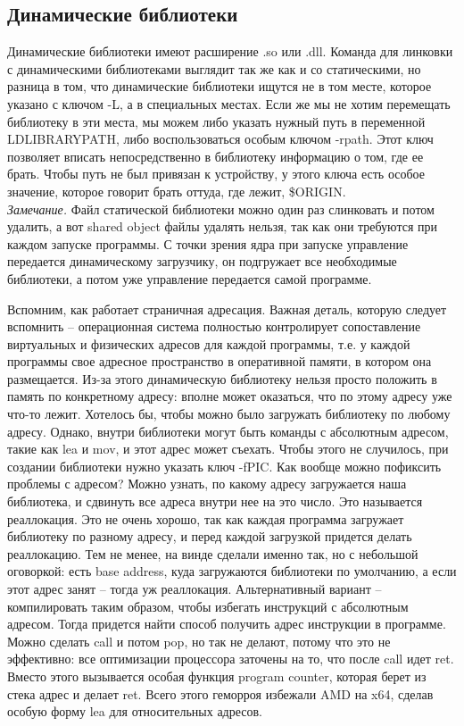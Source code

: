 \documentclass[12pt, a4paper]{article}
\begin{document}
\subsection{Динамические библиотеки}
Динамические библиотеки имеют расширение .so или .dll. Команда для линковки с динамическими библиотеками выглядит так же как и со статическими, но разница в том, что динамические библиотеки ищутся не в том месте, которое указано с ключом -L, а в специальных местах. Если же мы не хотим перемещать библиотеку в эти места, мы можем либо указать нужный путь в переменной LD\textunderscore LIBRARY\textunderscore PATH, либо воспользоваться особым ключом -rpath. Этот ключ позволяет вписать непосредственно в библиотеку информацию о том, где ее брать. Чтобы путь не был привязан к устройству, у этого ключа есть особое значение, которое говорит брать оттуда, где лежит, \$ORIGIN.\\
\textit{Замечание.} Файл статической библиотеки можно один раз слинковать и потом удалить, а вот shared object файлы удалять нельзя, так как они требуются при каждом запуске программы. С точки зрения ядра при запуске управление передается динамическому загрузчику, он подгружает все необходимые библиотеки, а потом уже управление передается самой программе.\\
\par Вспомним, как работает страничная адресация. Важная деталь, которую следует вспомнить -- операционная система полностью контролирует сопоставление виртуальных и физических адресов для каждой программы, т.е. у каждой программы свое адресное пространство в оперативной памяти, в котором она размещается. Из-за этого динамическую библиотеку нельзя просто положить в память по конкретному адресу: вполне может оказаться, что по этому адресу уже что-то лежит. Хотелось бы, чтобы можно было загружать библиотеку по любому адресу. Однако, внутри библиотеки могут быть команды с абсолютным адресом, такие как lea и mov, и этот адрес может съехать. Чтобы этого не случилось, при создании библиотеки нужно указать ключ -fPIC. Как вообще можно пофиксить проблемы с адресом? Можно узнать, по какому адресу загружается наша библиотека, и сдвинуть все адреса внутри нее на это число. Это называется реаллокация. Это не очень хорошо, так как каждая программа загружает библиотеку по разному адресу, и перед каждой загрузкой придется делать реаллокацию. Тем не менее, на винде сделали именно так, но с небольшой оговоркой: есть base address, куда загружаются библиотеки по умолчанию, а если этот адрес занят -- тогда уж реаллокация. Альтернативный вариант -- компилировать таким образом, чтобы избегать инструкций с абсолютным адресом. Тогда придется найти способ получить адрес инструкции в программе. Можно сделать call и потом pop, но так не делают, потому что это не эффективно: все оптимизации процессора заточены на то, что после call идет ret. Вместо этого вызывается особая функция program counter, которая берет из стека адрес и делает ret. Всего этого геморроя избежали AMD на x64, сделав особую форму lea для относительных адресов. \\
\end{document}
